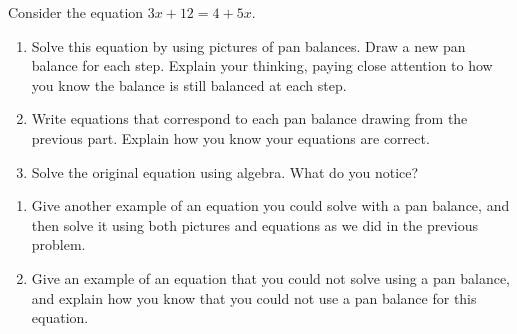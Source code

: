 \documentclass[nooutcomes,noauthor,handout]{ximera}
\begin{document}
\begin{problem}
Consider the equation $3x + 12 = 4 + 5x$.
\begin{enumerate}
	\item Solve this equation by using pictures of pan balances. Draw a new pan balance for each step. Explain your thinking, paying close attention to how you know the balance is still balanced at each step.
	\item Write equations that correspond to each pan balance drawing from the previous part. Explain how you know your equations are correct.
	\item Solve the original equation using algebra. What do you notice?
\end{enumerate}
\end{problem}




\begin{problem}
	\begin{enumerate}
		\item Give another example of an equation you could solve with a pan balance, and then solve it using both pictures and equations as we did in the previous problem.
		\item Give an example of an equation that you could not solve using a pan balance, and explain how you know that you could not use a pan balance for this equation.
	\end{enumerate}
\end{problem}



\newpage
\end{document}
